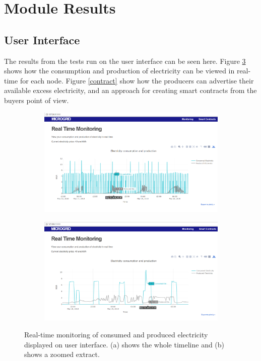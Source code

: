 \section{Module Results}

\subsection{User Interface}
The results from the tests run on the user interface can be seen here. Figure \ref{monitor} shows how the consumption and production of electricity can be viewed in real-time for each node. Figure \ref{contract} show how the producers can  advertise their available excess electricity, and an approach for creating smart contracts from the buyers point of view.

\begin{figure}
\centering
\begin{subfigure}[!htb]{1\textwidth}
   \includegraphics[width=1\linewidth]{Images/Monitor}
   \caption{}
   \label{fig:Ng1} 
\end{subfigure}

\begin{subfigure}[b]{1\textwidth}
   \includegraphics[width=1\linewidth]{Images/Monitor_zoomed}
   \caption{}
   \label{fig:Ng2}
\end{subfigure}

\caption{Real-time monitoring of consumed and produced electricity displayed on user interface. (a) shows the whole timeline and (b) shows a zoomed extract.}
\label{monitor}
\end{figure}



